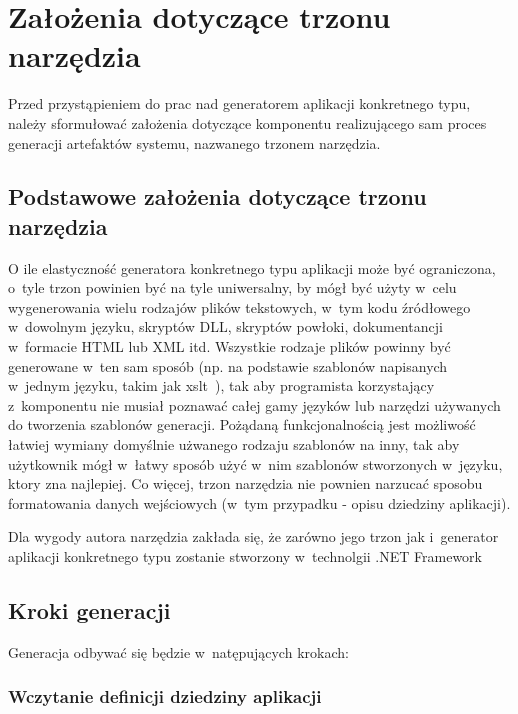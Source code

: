 \chapter{Założenia dotyczące trzonu narzędzia} \label{chap:implementation:core}

Przed przystąpieniem do prac nad generatorem aplikacji konkretnego typu, należy sformułować założenia dotyczące komponentu realizującego sam proces generacji artefaktów systemu, nazwanego trzonem narzędzia.



\section{Podstawowe założenia dotyczące trzonu narzędzia} \label{sec:core:basic_requirements}

O ile elastyczność generatora konkretnego typu aplikacji może być ograniczona, o~tyle trzon powinien być na tyle uniwersalny, by mógł być użyty w~celu wygenerowania wielu rodzajów plików tekstowych, w~tym kodu źródłowego w~dowolnym języku, skryptów DLL, skryptów powłoki, dokumentancji w~formacie HTML lub XML itd.
Wszystkie rodzaje plików powinny być generowane w~ten sam sposób (np. na podstawie szablonów napisanych w~jednym języku, takim jak xslt~\cite{xslt}), tak aby programista korzystający z~komponentu nie musiał poznawać całej gamy języków lub narzędzi używanych do tworzenia szablonów generacji.
Pożądaną funkcjonalnością jest możliwość łatwiej wymiany domyślnie użwanego rodzaju szablonów na inny, tak aby użytkownik mógł w~łatwy sposób użyć w~nim szablonów stworzonych w~języku, ktory zna najlepiej.
Co więcej, trzon narzędzia nie pownien narzucać sposobu formatowania danych wejściowych (w~tym przypadku - opisu dziedziny aplikacji).

Dla wygody autora narzędzia zakłada się, że zarówno jego trzon jak i~generator aplikacji konkretnego typu zostanie stworzony w~technolgii .NET Framework



\section{Kroki generacji}

Generacja odbywać się będzie w~natępujących krokach:


\subsection{Wczytanie definicji dziedziny aplikacji}

